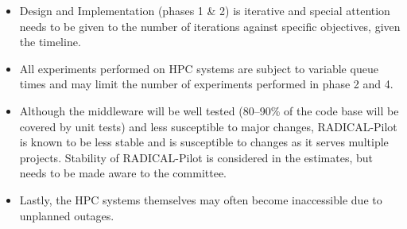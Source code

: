 \begin{itemize}
	\item Design and Implementation (phases 1 \& 2) is iterative and special attention 
	needs to be given to the number of iterations against specific objectives, 
	given the timeline.
  \item All experiments performed on HPC systems are subject to variable queue 
	times and may limit the number of experiments performed in phase 2 and 4.
	\item Although the middleware will be well tested (80--90\% of the code base 
	will be covered by unit tests) and less susceptible to major changes, RADICAL-Pilot 
	is known to be less stable and is susceptible to changes as it serves multiple 
	projects. Stability of RADICAL-Pilot is considered in the estimates, but needs 
	to be made aware to the committee.
	\item Lastly, the HPC systems themselves may often become inaccessible due to 
	unplanned outages.
\end{itemize}



